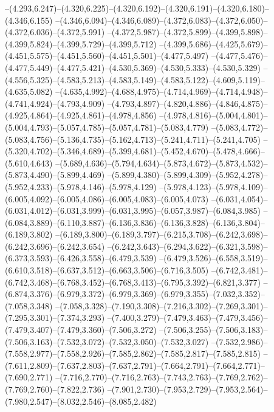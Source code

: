   --(4.293,6.247)--(4.320,6.225)--(4.320,6.192)--(4.320,6.191)--(4.320,6.180)--(4.346,6.155)%
  --(4.346,6.094)--(4.346,6.089)--(4.372,6.083)--(4.372,6.050)--(4.372,6.036)--(4.372,5.991)%
  --(4.372,5.987)--(4.372,5.899)--(4.399,5.898)--(4.399,5.824)--(4.399,5.729)--(4.399,5.712)%
  --(4.399,5.686)--(4.425,5.679)--(4.451,5.575)--(4.451,5.560)--(4.451,5.501)--(4.477,5.497)%
  --(4.477,5.476)--(4.477,5.449)--(4.477,5.421)--(4.530,5.369)--(4.530,5.333)--(4.530,5.329)%
  --(4.556,5.325)--(4.583,5.213)--(4.583,5.149)--(4.583,5.122)--(4.609,5.119)--(4.635,5.082)%
  --(4.635,4.992)--(4.688,4.975)--(4.714,4.969)--(4.714,4.948)--(4.741,4.924)--(4.793,4.909)%
  --(4.793,4.897)--(4.820,4.886)--(4.846,4.875)--(4.925,4.864)--(4.925,4.861)--(4.978,4.856)%
  --(4.978,4.816)--(5.004,4.801)--(5.004,4.793)--(5.057,4.785)--(5.057,4.781)--(5.083,4.779)%
  --(5.083,4.772)--(5.083,4.756)--(5.136,4.735)--(5.162,4.713)--(5.241,4.711)--(5.241,4.705)%
  --(5.320,4.702)--(5.346,4.689)--(5.399,4.681)--(5.452,4.670)--(5.478,4.666)--(5.610,4.643)%
  --(5.689,4.636)--(5.794,4.634)--(5.873,4.672)--(5.873,4.532)--(5.873,4.490)--(5.899,4.469)%
  --(5.899,4.380)--(5.899,4.309)--(5.952,4.278)--(5.952,4.233)--(5.978,4.146)--(5.978,4.129)%
  --(5.978,4.123)--(5.978,4.109)--(6.005,4.092)--(6.005,4.086)--(6.005,4.083)--(6.005,4.073)%
  --(6.031,4.054)--(6.031,4.012)--(6.031,3.999)--(6.031,3.995)--(6.057,3.987)--(6.084,3.985)%
  --(6.084,3.889)--(6.110,3.887)--(6.136,3.836)--(6.136,3.828)--(6.136,3.804)--(6.189,3.802)%
  --(6.189,3.800)--(6.189,3.797)--(6.215,3.708)--(6.242,3.698)--(6.242,3.696)--(6.242,3.654)%
  --(6.242,3.643)--(6.294,3.622)--(6.321,3.598)--(6.373,3.593)--(6.426,3.558)--(6.479,3.539)%
  --(6.479,3.526)--(6.558,3.519)--(6.610,3.518)--(6.637,3.512)--(6.663,3.506)--(6.716,3.505)%
  --(6.742,3.481)--(6.742,3.468)--(6.768,3.452)--(6.768,3.413)--(6.795,3.392)--(6.821,3.377)%
  --(6.874,3.376)--(6.979,3.372)--(6.979,3.369)--(6.979,3.355)--(7.032,3.352)--(7.058,3.348)%
  --(7.058,3.328)--(7.190,3.308)--(7.216,3.302)--(7.269,3.301)--(7.295,3.301)--(7.374,3.293)%
  --(7.400,3.279)--(7.479,3.463)--(7.479,3.456)--(7.479,3.407)--(7.479,3.360)--(7.506,3.272)%
  --(7.506,3.255)--(7.506,3.183)--(7.506,3.163)--(7.532,3.072)--(7.532,3.050)--(7.532,3.027)%
  --(7.532,2.986)--(7.558,2.977)--(7.558,2.926)--(7.585,2.862)--(7.585,2.817)--(7.585,2.815)%
  --(7.611,2.809)--(7.637,2.803)--(7.637,2.791)--(7.664,2.791)--(7.664,2.771)--(7.690,2.771)%
  --(7.716,2.770)--(7.716,2.763)--(7.743,2.763)--(7.769,2.762)--(7.769,2.760)--(7.822,2.736)%
  --(7.901,2.730)--(7.953,2.729)--(7.953,2.564)--(7.980,2.547)--(8.032,2.546)--(8.085,2.482)%
